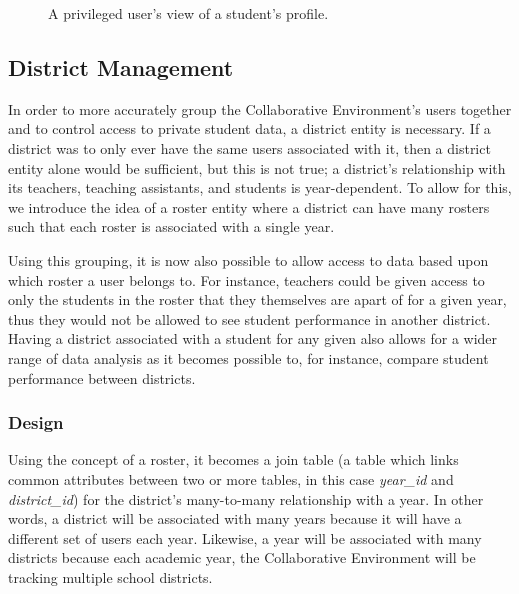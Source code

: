 \begin{figure}[h!]
	\centering
	\caption{A privileged user's view of a student's profile.}
	\label{fig:screens-user-student-profile}
\end{figure}


\subsection{District Management}
\label{subsec:design-district}
In order to more accurately group the Collaborative Environment's users together and to control access to private student data, a district entity is necessary. If a district was to only ever have the same users associated with it, then a district entity alone would be sufficient, but this is not true; a district's relationship with its teachers, teaching assistants, and students is year-dependent. To allow for this, we introduce the idea of a roster entity where a district can have many rosters such that each roster is associated with a single year.

Using this grouping, it is now also possible to allow access to data based upon which roster a user belongs to. For instance, teachers could be given access to only the students in the roster that they themselves are apart of for a given year, thus they would not be allowed to see student performance in another district. Having a district associated with a student for any given also allows for a wider range of data analysis as it becomes possible to, for instance, compare student performance between districts.

\subsubsection{Design}
Using the concept of a roster, it becomes a join table (a table which links common attributes between two or more tables, in this case \emph{year\_id} and \emph{district\_id}) for the district's  many-to-many relationship with a year. In other words, a district will be associated with many years because it will have a different set of users each year. Likewise, a year will be associated with many districts because each academic year, the Collaborative Environment will be tracking multiple school districts.

